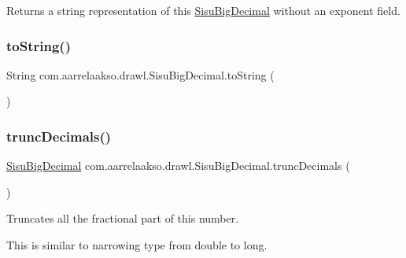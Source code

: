 \begin{DoxyReturn}{Returns}
a string representation of this \hyperlink{classcom_1_1aarrelaakso_1_1drawl_1_1_sisu_big_decimal}{Sisu\+Big\+Decimal} without an exponent field. 
\end{DoxyReturn}
\mbox{\label{classcom_1_1aarrelaakso_1_1drawl_1_1_sisu_big_decimal_ac05b8909bde406486e3fb45e154c5ff4}} 
\subsubsection{\texorpdfstring{to\+String()}{toString()}}
{\footnotesize\ttfamily String com.\+aarrelaakso.\+drawl.\+Sisu\+Big\+Decimal.\+to\+String (\begin{DoxyParamCaption}{ }\end{DoxyParamCaption})}

\mbox{\label{classcom_1_1aarrelaakso_1_1drawl_1_1_sisu_big_decimal_ab81d0189bbfd5f1b69de6781ac383ac3}} 
\subsubsection{\texorpdfstring{trunc\+Decimals()}{truncDecimals()}}
{\footnotesize\ttfamily \hyperlink{classcom_1_1aarrelaakso_1_1drawl_1_1_sisu_big_decimal}{Sisu\+Big\+Decimal} com.\+aarrelaakso.\+drawl.\+Sisu\+Big\+Decimal.\+trunc\+Decimals (\begin{DoxyParamCaption}{ }\end{DoxyParamCaption})\hspace{0.3cm}{\ttfamily [protected]}}



Truncates all the fractional part of this number. 

This is similar to narrowing type from double to long.

